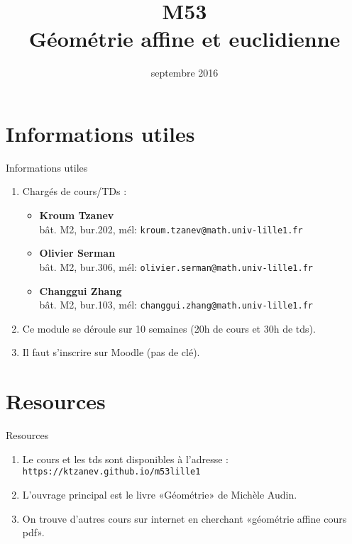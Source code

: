 \documentclass{m53beamer}
\title{M53\\Géométrie affine et euclidienne}
\date{septembre 2016}
\begin{document}
\begin{frame}
  \titlepage
\end{frame}

\section{Informations utiles}
\begin{frame}{Informations utiles}
  \begin{enumerate}[<+(1)->]
    \item Chargés de cours/TDs :
          \begin{itemize}
            \item \textbf{Kroum Tzanev}\\
              bât. M2, bur.202, mél: \texttt{kroum.tzanev@math.univ-lille1.fr}
            \item \textbf{Olivier Serman}\\
              bât. M2, bur.306, mél: \texttt{olivier.serman@math.univ-lille1.fr}
            \item \textbf{Changgui Zhang}\\
              bât. M2, bur.103, mél: \texttt{changgui.zhang@math.univ-lille1.fr}
          \end{itemize}
    \item Ce module se déroule sur 10 semaines (20h de cours et 30h de tds).
    \item Il faut s'inscrire sur Moodle (pas de clé).
  \end{enumerate}
\end{frame}

\section{Resources}
\begin{frame}{Resources}
  \begin{enumerate}[<+(1)->]
    \item Le cours et les tds sont disponibles à l'adresse :
      \texttt{https://ktzanev.github.io/m53lille1}
    \item L'ouvrage principal est le livre «Géométrie» de Michèle Audin.
    \item On trouve d'autres cours sur internet en cherchant «géométrie affine cours pdf».
  \end{enumerate}
\end{frame}
\end{document}
